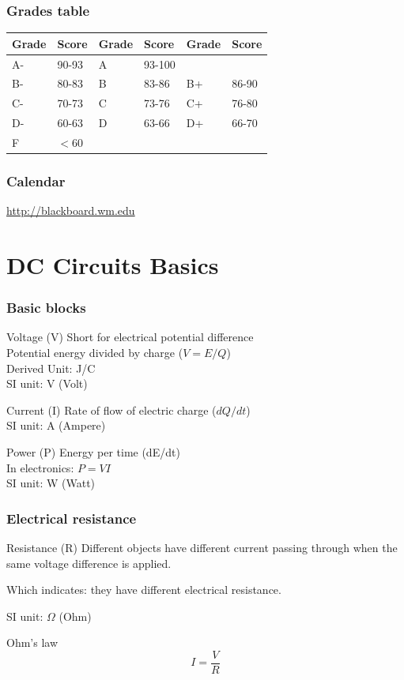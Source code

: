 \documentclass[beamer]{standalone}
\begin{document}
\begin{frame}
\frametitle{Grades table}
\begin{center}\begin{tabular}{|l|l|l|l|l|l|}
\hline \textbf{Grade} & \textbf{Score} & \textbf{Grade} &
\textbf{Score} & \textbf{Grade} & \textbf{Score} \\
\hline A- & 90-93 & A & 93-100 &    &       \\
\hline B- & 80-83 & B & 83-86  & B+ & 86-90 \\
\hline C- & 70-73 & C & 73-76  & C+ & 76-80 \\
\hline D- & 60-63 & D & 63-66  & D+ & 66-70 \\
\hline F  & $<$60 &   &        &    &       \\
\hline \end{tabular}\end{center}
\end{frame}


\begin{frame}
\frametitle{Calendar}
\url{http://blackboard.wm.edu}
\end{frame}

\section{DC Circuits Basics}
\begin{frame}
 \frametitle{Basic blocks}
 \begin{block} { Voltage (V)}
  Short for electrical potential difference\\
  Potential energy divided by charge ($V=E/Q$) \\
  Derived Unit: J/C \\  
  SI unit: V (Volt)
 \end{block}
 
 \begin{block} { Current (I)}
  Rate of flow of electric charge ($dQ/dt$)\\
  SI unit: A (Ampere)
 \end{block}

 \begin{block} {Power (P)}
  Energy per time (dE/dt) \\
  In electronics: $P=V I$ \\
  SI unit: W (Watt)
 \end{block}
\end{frame}

\begin{frame}
 \frametitle{Electrical resistance}
 \begin{block} { Resistance (R) }
 Different objects have different current passing through when the same voltage difference is applied.
 
 Which indicates: they have different
 electrical resistance.

 SI unit: $\Omega$ (Ohm)
 \end{block}

 \begin{block}{Ohm's law}
 \[I = \frac{V}{R} \]
 \end{block}
\end{frame}
\end{document}
